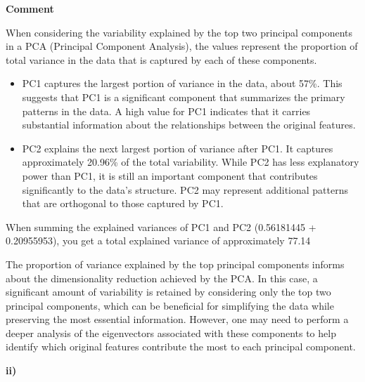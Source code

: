 \documentclass{article}
\begin{document}
\textbf{Comment}

When considering the variability explained by the top two principal components in a PCA (Principal Component Analysis), the values represent the proportion of total variance in the data that is captured by each of these components.
\begin{itemize}
  \item PC1 captures the largest portion of variance in the data, about 57\%. This suggests that PC1 is a significant component that summarizes the primary patterns in the data. A high value for PC1 indicates that it carries substantial information about the relationships between the original features.
  \item PC2 explains the next largest portion of variance after PC1. It captures approximately 20.96\% of the total variability. While PC2 has less explanatory power than PC1, it is still an important component that contributes significantly to the data's structure. PC2 may represent additional patterns that are orthogonal to those captured by PC1.
\end{itemize}
When summing the explained variances of PC1 and PC2 (0.56181445 + 0.20955953), you get a total explained variance of approximately 77.14%

The proportion of variance explained by the top principal components informs about the dimensionality reduction achieved by the PCA. In this case, a significant amount of variability is retained by considering only the top two principal components, which can be beneficial for simplifying the data while preserving the most essential information.
However, one may need to perform a deeper analysis of the eigenvectors associated with these components to help identify which original features contribute the most to each principal component.


\textbf{ii)}
\end{document}
